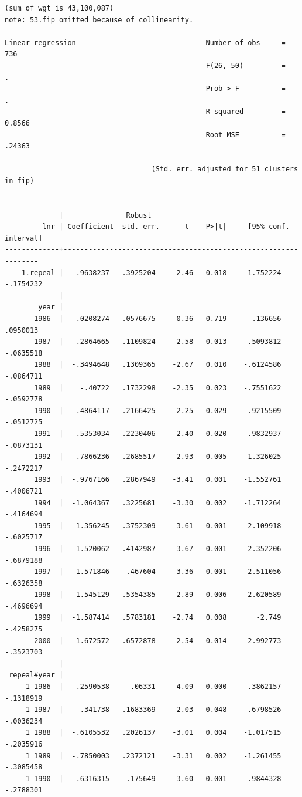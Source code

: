 \documentclass[
]{book}
\begin{document}
\begin{verbatim}
(sum of wgt is 43,100,087)
note: 53.fip omitted because of collinearity.

Linear regression                               Number of obs     =        736
                                                F(26, 50)         =          .
                                                Prob > F          =          .
                                                R-squared         =     0.8566
                                                Root MSE          =     .24363

                                   (Std. err. adjusted for 51 clusters in fip)
------------------------------------------------------------------------------
             |               Robust
         lnr | Coefficient  std. err.      t    P>|t|     [95% conf. interval]
-------------+----------------------------------------------------------------
    1.repeal |  -.9638237   .3925204    -2.46   0.018    -1.752224   -.1754232
             |
        year |
       1986  |  -.0208274   .0576675    -0.36   0.719     -.136656    .0950013
       1987  |  -.2864665   .1109824    -2.58   0.013    -.5093812   -.0635518
       1988  |  -.3494648   .1309365    -2.67   0.010    -.6124586   -.0864711
       1989  |    -.40722   .1732298    -2.35   0.023    -.7551622   -.0592778
       1990  |  -.4864117   .2166425    -2.25   0.029    -.9215509   -.0512725
       1991  |  -.5353034   .2230406    -2.40   0.020    -.9832937   -.0873131
       1992  |  -.7866236   .2685517    -2.93   0.005    -1.326025   -.2472217
       1993  |  -.9767166   .2867949    -3.41   0.001    -1.552761   -.4006721
       1994  |  -1.064367   .3225681    -3.30   0.002    -1.712264   -.4164694
       1995  |  -1.356245   .3752309    -3.61   0.001    -2.109918   -.6025717
       1996  |  -1.520062   .4142987    -3.67   0.001    -2.352206   -.6879188
       1997  |  -1.571846    .467604    -3.36   0.001    -2.511056   -.6326358
       1998  |  -1.545129   .5354385    -2.89   0.006    -2.620589   -.4696694
       1999  |  -1.587414   .5783181    -2.74   0.008       -2.749   -.4258275
       2000  |  -1.672572   .6572878    -2.54   0.014    -2.992773   -.3523703
             |
 repeal#year |
     1 1986  |  -.2590538     .06331    -4.09   0.000    -.3862157   -.1318919
     1 1987  |   -.341738   .1683369    -2.03   0.048    -.6798526   -.0036234
     1 1988  |  -.6105532   .2026137    -3.01   0.004    -1.017515   -.2035916
     1 1989  |  -.7850003   .2372121    -3.31   0.002    -1.261455   -.3085458
     1 1990  |  -.6316315    .175649    -3.60   0.001    -.9844328   -.2788301

\end{verbatim}
\end{document}
